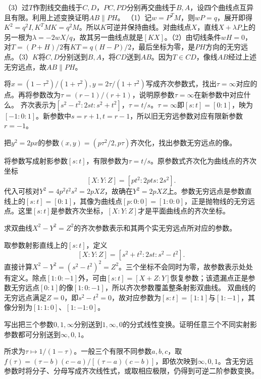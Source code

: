 （3）过\(T\)作割线交曲线于\(C,D\)，\(PC,PD\)分别再交曲线于\(B,A\)，设四个曲线点互异且有限。利用上述变换证明\(AB\parallel PH\)。
\solutionanswer
（1）记\(w=P^TM\)，则\(wP=q\)，展开即得\(K^2=q^2I,K^TMK=q^2M\)。所以\(K\)可逆并保持曲线。对曲线点\(X\)，直线\(X+\lambda P\)上的另一根为\(\lambda=-2wX/q\)，故其另一曲线点就是\([KX]\)。（2）由切线条件\(wH=0\)，对\(T=(P+H)/2\)有\(KT=q(H-P)/2\)，最后坐标为零，是\(PH\)方向的无穷远点。（3）\(K\)将\(C,D\)分别送到\(B,A\)，将\(CD\)送到\(AB\)。因为\(T\in CD\)，像线\(AB\)经过上述无穷远点，故\(AB\parallel PH\)。


将\(x=(1-\tau^2)/(1+\tau^2),y=2\tau/(1+\tau^2)\)写成齐次参数式，找出\(\tau=\infty\)对应的点。再将参数改为\(\tau=(r-1)/(r+1)\)，说明原参数\(\tau=\infty\)在新参数中对应什么。
\solutionanswer
齐次表示为\([s^2-t^2:2st:s^2+t^2]\)，\(\tau=t/s\)。\(\tau=\infty\)即\([s:t]=[0:1]\)，映为\([-1:0:1]\)。新参数中\(s=r+1,t=r-1\)，所以旧无穷远参数对应有限新参数\(r=-1\)。


把\(y^2=2px\)的参数\((x,y)=(p\tau^2/2,p\tau)\)齐次化，找出参数无穷远点的像。
\par
\solutionanswer
将参数写成射影参数\([s:t]\)，有限参数为\(\tau=t/s\)。原参数式齐次化为曲线点的齐次坐标
\[
[X:Y:Z]=[p t^2:2p ts:2s^2].
\]
代入可核对\(Y^2=4p^2t^2s^2=2pXZ\)，故确在\(Y^2=2pXZ\)上。参数无穷远点是参数直线上的\([s:t]=[0:1]\)，其像为曲线点\([p:0:0]=[1:0:0]\)，正是抛物线的无穷远点。这里\([s:t]\)是参数齐次坐标，\([X:Y:Z]\)才是平面曲线点的齐次坐标。


求双曲线\(X^2-Y^2=Z^2\)的齐次参数表示和其两个实无穷远点所对应的参数。
\par
\solutionanswer
取参数射影直线上的\([s:t]\)，定义
\[
[X:Y:Z]=[s^2+t^2:2st:s^2-t^2].
\]
直接计算\(X^2-Y^2=(s^2-t^2)^2=Z^2\)。三个坐标不会同时为零，故参数表示处处有定义。除点\([1:0:-1]\)外，可由\([s:t]=[X+Z:Y]\)恢复参数；该遗漏点正是参数无穷远点\([0:1]\)的像\([1:0:-1]\)，所以齐次参数覆盖整条射影双曲线。
双曲线的无穷远点满足\(Z=0\)，即\(s^2-t^2=0\)，故对应参数为\([s:t]=[1:1]\)与\([1:-1]\)，其像分别为\([1:1:0]\)、\([1:-1:0]\)。


写出把三个参数\(0,1,\infty\)分别送到\(1,\infty,0\)的分式线性变换。证明任意三个不同实射影参数都可分别送到\(\infty,0,1\)。
\par
\solutionanswer
所求为\(\tau\mapsto1/(1-\tau)\)。一般三个有限不同参数\(a,b,c\)，取\(f(\tau)=(\tau-b)(c-a)/[(\tau-a)(c-b)]\)，即依次映到\(\infty,0,1\)。含无穷远参数时将分子、分母写成齐次线性式，或取相应极限，仍得到可逆二阶参数变换。


